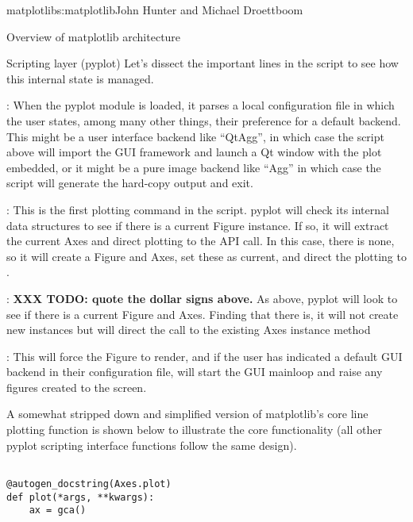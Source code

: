 \begin{aosachapter}{matplotlib}{s:matplotlib}{John Hunter and Michael Droettboom}
\begin{aosasect1}{Overview of matplotlib architecture}
\begin{aosasect2}{Scripting layer (pyplot)}
Let's dissect the important lines in the script to see how this
internal state is managed.

\begin{aosaitemize}

  \item {}: When the pyplot module
    is loaded, it parses a local configuration file in which the user
    states, among many other things, their preference for a default
    backend.  This might be a user interface backend like ``QtAgg'',
    in which case the script above will import the GUI framework and
    launch a Qt window with the plot embedded, or it might be a pure
    image backend like ``Agg'' in which case the script will generate
    the hard-copy output and exit.

  \item {}: This is the first plotting command
    in the script.  pyplot will check its internal data structures to
    see if there is a current Figure instance.  If so, it will extract
    the current Axes and direct plotting to the  API
    call.  In this case, there is none, so it will create a Figure and
    Axes, set these as current, and direct the plotting to
    .

  \item {}:
    \textbf{XXX TODO: quote the dollar signs above.}
    As above, pyplot will look to see if there
    is a current Figure and Axes.  Finding that there is, it will not
    create new instances but will direct the call to the existing Axes
    instance method 

  \item {}: This will force the Figure to render, and
    if the user has indicated a default GUI backend in their
    configuration file, will start the GUI mainloop and raise any
    figures created to the screen.

\end{aosaitemize}

A somewhat stripped down and simplified version of matplotlib's core
line plotting function  is shown below to
illustrate the core functionality (all other pyplot scripting
interface functions follow the same design).

\begin{verbatim}

@autogen_docstring(Axes.plot)
def plot(*args, **kwargs):
    ax = gca()


\end{verbatim}
\end{aosasect2}
\end{aosasect1}
\end{aosachapter}
